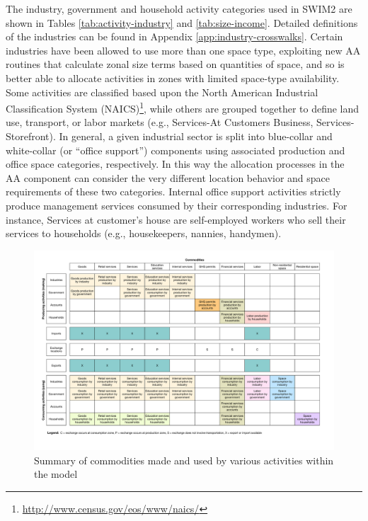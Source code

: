 The industry, government and household activity categories used in SWIM2 are shown in Tables \ref{tab:activity-industry} and \ref{tab:size-income}. Detailed definitions of the industries can be found in Appendix \ref{app:industry-crosswalks}. Certain industries have been allowed to use more than one space type, exploiting new AA routines that calculate zonal size terms based on quantities of space, and so is better able to allocate activities in zones with limited space-type availability. Some activities are classified based upon the North American Industrial Classification System (NAICS)\footnote{\url{http://www.census.gov/eos/www/naics/}}, while others are grouped together to define land use, transport, or labor markets (e.g., Services-At Customers Business, Services-Storefront). In general, a given industrial sector is split into blue-collar and white-collar (or ``office support'') components using associated production and office space categories, respectively. In this way the allocation processes in the AA component can consider the very different location behavior and space requirements of these two categories. Internal office support activities strictly produce management services consumed by their corresponding industries. For instance, Services at customer's house are self-employed workers who sell their services to households (e.g., housekeepers, nannies, handymen).

\begin{figure}     %
\centering
\includegraphics[scale=0.45]{overview/make-use-summary}
\caption{Summary of commodities made and used by various activities within the model}
\label{fig:make-use-summary}
\end{figure}

